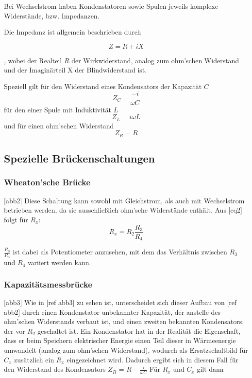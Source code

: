 Bei Wechselstrom haben Kondenstatoren sowie Spulen jeweils komplexe Widerstände, bzw. Impedanzen.

Die Impedanz ist allgemein beschrieben durch

\begin{equation}
    Z = R + iX
\end{equation}

, wobei der Realteil $R$ der Wirkwiderstand, analog zum ohm'schen Widerstand und  der Imaginärteil
X der Blindwiderstand ist. 

Speziell gilt für den Widerstand eines Kondensators der Kapazität $C$ \begin{equation}
    Z_C = \frac{-i}{\omega C}
\end{equation} für den einer Spule mit Induktivität $L$ \begin{equation}
    Z_L = i\omega L
\end{equation} und für einen ohm'schen Widerstand \begin{equation}
    Z_R = R
\end{equation}

\subsection{Spezielle Brückenschaltungen}

\subsubsection{Wheaton'sche Brücke}
[abb2]
Diese Schaltung kann sowohl mit Gleichstrom, als auch mit Wechselstrom betrieben werden, da sie ausschließlich
ohm'sche Widerstände enthält. 
Aus [eq2] folgt für $R_x$:
\begin{equation}
    R_x = R_2 \frac{R_3}{R_4}
\end{equation}

$\frac{R_3}{R_4}$ ist dabei als Potentiometer anzusehen, mit dem das Verhältnis zwischen $R_3$ und $R_4$ 
variiert werden kann. 

\subsubsection{Kapazitätsmessbrücke}
[abb3]
Wie in [ref abb3] zu sehen ist, unterscheidet sich dieser Aufbau von [ref abb2] durch 
einen Kondenstator unbekannter Kapazität, der anstelle des ohm'schen Widerstands verbaut ist, und einen zweiten
bekannten Kondensators, der vor $R_2$ geschaltet ist. 
Ein Kondenstator hat in der 
Realität die Eigenschaft, dass er beim Speichern elektrischer Energie einen Teil dieser in Wärmeenergie umwandelt
(analog zum ohm'schen Widerstand),
wodurch als Ersatzschaltbild für $C_x$ zusätzlich ein $R_x$ eingezeichnet wird. 
Dadurch ergibt sich in diesem Fall für den Widerstand des Kondensators $ Z_R$ = $R - \frac{i}{\omega C}$
Für $R_x$ und $C_x$ gilt dann 

